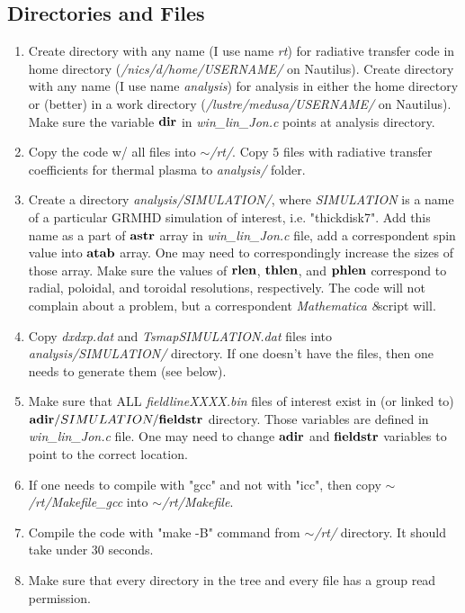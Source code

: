 \documentclass{emulateapj}
\newcommand{\mat}{\textit{Mathematica 8}}
\begin{document}
\subsection{Directories and Files}
\begin{enumerate}
\item{Create directory with any name (I use name \textit{rt}) for radiative transfer code in home directory (\textit{/nics/d/home/USERNAME/} on Nautilus).
Create directory with any name (I use name \textit{analysis}) for analysis in either the home directory or (better) in a work directory (\textit{/lustre/medusa/USERNAME/} on Nautilus). 
Make sure the variable ${\bf dir}$ in \textit{win\_lin\_Jon.c} points at analysis directory.}
\item{Copy the code w/ all files into \textit{$\sim$/rt/}. Copy $5$ files with radiative transfer coefficients for thermal plasma to \textit{analysis/} folder.}
\item{Create a directory \textit{analysis/SIMULATION/}, where \textit{SIMULATION} is a name of a particular GRMHD simulation of interest, i.e. "thickdisk7".
Add this name as a part of ${\bf astr}$ array in \textit{win\_lin\_Jon.c} file, add a correspondent spin value into ${\bf atab}$ array.
One may need to correspondingly increase the sizes of those array. Make sure the values of ${\bf rlen}$, ${\bf thlen}$, and ${\bf phlen}$ correspond to radial,
poloidal, and toroidal resolutions, respectively. The code will not complain about a problem, but a correspondent \mat script will.}
\item{Copy \textit{dxdxp.dat} and \textit{TsmapSIMULATION.dat} files into \textit{analysis/SIMULATION/} directory. If one doesn't have the files, 
then one needs to generate them (see below).}
\item{Make sure that ALL \textit{fieldlineXXXX.bin} files of interest exist in (or linked to) ${\bf adir}/SIMULATION/{\bf fieldstr}$ directory. 
Those variables are defined in \textit{win\_lin\_Jon.c} file. One may need to change ${\bf adir}$ and ${\bf fieldstr}$ variables to point to the correct location.}
\item{If one needs to compile with "gcc" and not with "icc", then copy \textit{$\sim$/rt/Makefile\_gcc} into \textit{$\sim$/rt/Makefile}.}
\item{Compile the code with "make -B" command from \textit{$\sim$/rt/} directory. It should take under 30 seconds.}
\item{Make sure that every directory in the tree and every file has a group read permission.}
\end{enumerate}
\end{document}
